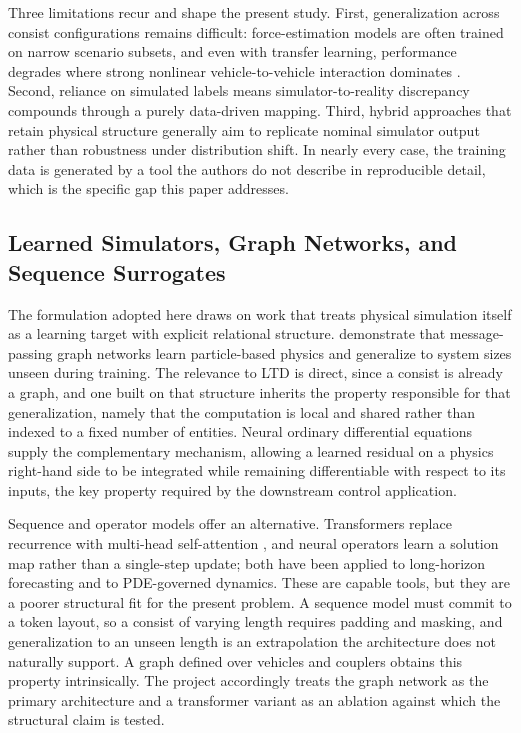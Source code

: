 \documentclass[numbered]{trbunofficial}
\begin{document}
Three limitations recur and shape the present study. First, generalization across consist configurations remains difficult: force-estimation models are often trained on narrow scenario subsets, and even with transfer learning, performance degrades where strong nonlinear vehicle-to-vehicle interaction dominates \citep{zhang_in_train_forces,intrainnet}. Second, reliance on simulated labels means simulator-to-reality discrepancy compounds through a purely data-driven mapping. Third, hybrid approaches that retain physical structure generally aim to replicate nominal simulator output rather than robustness under distribution shift. In nearly every case, the training data is generated by a tool the authors do not describe in reproducible detail, which is the specific gap this paper addresses.

\subsection{Learned Simulators, Graph Networks, and Sequence Surrogates}

The formulation adopted here draws on work that treats physical simulation itself as a learning target with explicit relational structure. \citet{sanchez2020gns} demonstrate that message-passing graph networks learn particle-based physics and generalize to system sizes unseen during training. The relevance to LTD is direct, since a consist is already a graph, and one built on that structure inherits the property responsible for that generalization, namely that the computation is local and shared rather than indexed to a fixed number of entities. Neural ordinary differential equations \citep{chen2018neuralode} supply the complementary mechanism, allowing a learned residual on a physics right-hand side to be integrated while remaining differentiable with respect to its inputs, the key property required by the downstream control application.

Sequence and operator models offer an alternative. Transformers replace recurrence with multi-head self-attention \citep{vaswani2017attention}, and neural operators learn a solution map rather than a single-step update; both have been applied to long-horizon forecasting and to PDE-governed dynamics. These are capable tools, but they are a poorer structural fit for the present problem. A sequence model must commit to a token layout, so a consist of varying length requires padding and masking, and generalization to an unseen length is an extrapolation the architecture does not naturally support. A graph defined over vehicles and couplers obtains this property intrinsically. The project accordingly treats the graph network as the primary architecture and a transformer variant as an ablation against which the structural claim is tested.
\end{document}
